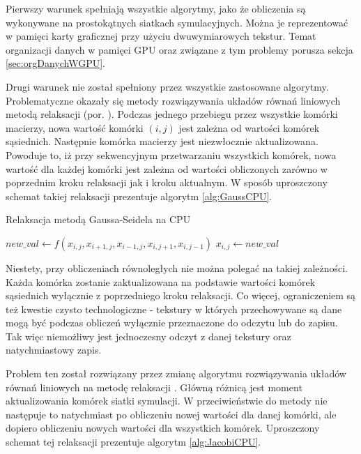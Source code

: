 Pierwszy warunek spełniają wszystkie algorytmy, jako że obliczenia są wykonywane
na prostokątnych siatkach symulacyjnych. Można je reprezentować w pamięci karty
graficznej przy użyciu dwuwymiarowych tekstur. Temat organizacji danych w
pamięci GPU oraz związane z tym problemy porusza sekcja \ref{sec:orgDanychWGPU}.

Drugi warunek nie został spełniony przez wszystkie zastosowane algorytmy.
Problematyczne okazały się metody rozwiązywania układów równań liniowych metodą
relaksacji  (por. \cite{GaussSeidel}). Podczas jednego
przebiegu przez wszystkie komórki macierzy, nowa wartość komórki $(i, j)$ jest
zależna od wartości komórek sąsiednich. Następnie komórka macierzy jest
niezwłocznie aktualizowana. Powoduje to, iż przy sekwencyjnym przetwarzaniu
wszystkich komórek, nowa wartość dla każdej komórki jest zależna od wartości
obliczonych zarówno w poprzednim kroku relaksacji jak i kroku aktualnym. W
sposób uproszczony schemat takiej relaksacji prezentuje algorytm
\ref{alg:GaussCPU}.

\begin{algorithm}[!h]
  \caption{Relaksacja metodą Gaussa-Seidela na CPU}
  \label{alg:GaussCPU}
\begin{algorithmic}
    \State $new\_val\gets f(x_{i,j}, x_{i+1,j}, x_{i-1,j}, x_{i,j+1}, x_{i,j-1})$
    \State $x_{i,j}\gets new\_val$
  \EndFor
\EndFor
\end{algorithmic}
\end{algorithm}

Niestety, przy obliczeniach równoległych nie można polegać na takiej zależności.
Każda komórka zostanie zaktualizowana na podstawie wartości komórek sąsiednich
wyłącznie z poprzedniego kroku relaksacji. Co więcej, ograniczeniem są też
kwestie czysto technologiczne - tekstury w których przechowywane są dane mogą
być podczas obliczeń wyłącznie przeznaczone do odczytu lub do zapisu. Tak więc
niemożliwy jest jednoczesny odczyt z danej tekstury oraz natychmiastowy zapis.

Problem ten został rozwiązany przez zmianę algorytmu rozwiązywania układów
równań liniowych na metodę relaksacji . Główną różnicą jest moment
aktualizowania komórek siatki symulacji. W przeciwieństwie do metody  nie następuje to natychmiast po obliczeniu nowej wartości dla danej
komórki, ale dopiero obliczeniu nowych wartości dla wszystkich komórek.
Uproszczony schemat tej relaksacji prezentuje algorytm \ref{alg:JacobiCPU}.

